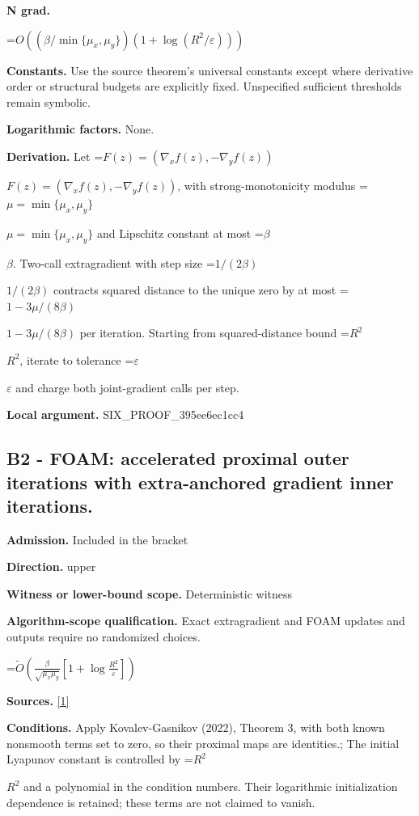 \documentclass[10pt,a4paper]{article}
\newcommand{\AtlasMath}[1]{\par\begingroup\centering\setbox0=\hbox{$\displaystyle #1$}\ifdim\wd0>1.4\linewidth\typeout{ATLAS WIDE FORMULA: \the\wd0}\fi\ifdim\wd0>\linewidth\resizebox{\linewidth}{!}{\box0}\else\box0\fi\par\endgroup}
\newcommand{\AtlasInlineMath}[1]{\begingroup\setbox0=\hbox{$#1$}\ifdim\wd0>.4\linewidth\endgroup\AtlasMath{#1}\else\endgroup$#1$\fi}
\begin{document}
\textbf{N grad.}



\AtlasMath{O((\beta/\min\{\mu_x,\mu_y\})(1+\log(R^2/\varepsilon)))}


\textbf{Constants.} Use the source theorem’s universal constants except where derivative order or structural budgets are explicitly fixed. Unspecified sufficient thresholds remain symbolic.



\textbf{Logarithmic factors.} None.



\textbf{Derivation.} Let \AtlasInlineMath{F(z)=(\nabla_x f(z),-\nabla_y f(z))}, with strong-monotonicity modulus \AtlasInlineMath{\mu=\min\{\mu_x,\mu_y\}} and Lipschitz constant at most \AtlasInlineMath{\beta}. Two-call extragradient with step size \AtlasInlineMath{1/(2\beta)} contracts squared distance to the unique zero by at most \AtlasInlineMath{1-3\mu/(8\beta)} per iteration. Starting from squared-distance bound \AtlasInlineMath{R^2}, iterate to tolerance \AtlasInlineMath{\varepsilon} and charge both joint-gradient calls per step.



\textbf{Local argument.} SIX\_PROOF\_395ee6ec1cc4



\subsection{B2 - FOAM: accelerated proximal outer iterations with extra-anchored gradient inner iterations.}


\textbf{Admission.} Included in the bracket



\textbf{Direction.} upper



\textbf{Witness or lower-bound scope.} Deterministic witness



\textbf{Algorithm-scope qualification.} Exact extragradient and FOAM updates and outputs require no randomized choices.



\AtlasMath{\widetilde{O}\!\left(\frac{\beta}{\sqrt{\mu_x\mu_y}}\left[1+\log\frac{R^2}{\varepsilon}\right]\right)}


\textbf{Sources.} \href{https://arxiv.org/pdf/2205.05653v1}{[1]}



\textbf{Conditions.} Apply Kovalev-Gasnikov (2022), Theorem 3, with both known nonsmooth terms set to zero, so their proximal maps are identities.; The initial Lyapunov constant is controlled by \AtlasInlineMath{R^2} and a polynomial in the condition numbers. Their logarithmic initialization dependence is retained; these terms are not claimed to vanish.
\end{document}
